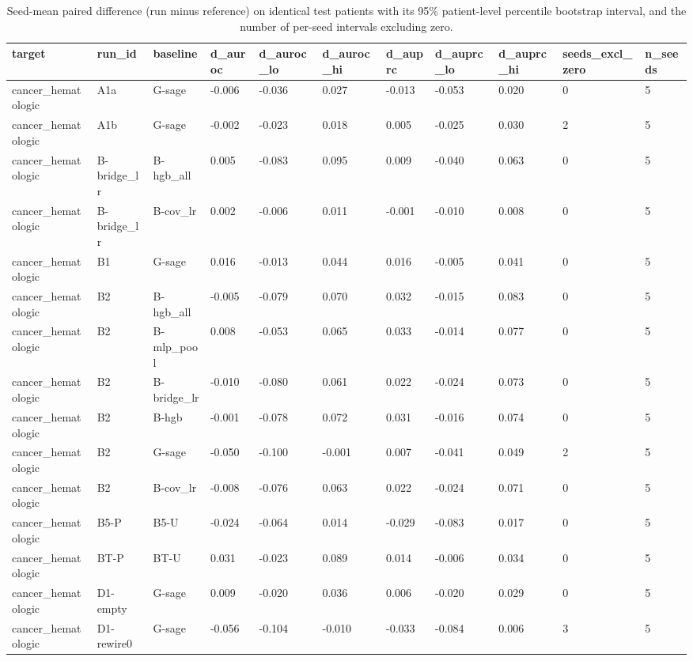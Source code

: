 \begin{table}[t]
\centering\small
\caption{Seed-mean paired difference (run minus reference) on identical test patients with its 95\% patient-level percentile bootstrap interval, and the number of per-seed intervals excluding zero.}\label{tab:paired}
\begin{tabular}{lllllllllll}
\toprule
target & run\_id & baseline & d\_auroc & d\_auroc\_lo & d\_auroc\_hi & d\_auprc & d\_auprc\_lo & d\_auprc\_hi & seeds\_excl\_zero & n\_seeds \\
\midrule
cancer\_hematologic & A1a & G-sage & -0.006 & -0.036 & 0.027 & -0.013 & -0.053 & 0.020 & 0 & 5 \\
cancer\_hematologic & A1b & G-sage & -0.002 & -0.023 & 0.018 & 0.005 & -0.025 & 0.030 & 2 & 5 \\
cancer\_hematologic & B-bridge\_lr & B-hgb\_all & 0.005 & -0.083 & 0.095 & 0.009 & -0.040 & 0.063 & 0 & 5 \\
cancer\_hematologic & B-bridge\_lr & B-cov\_lr & 0.002 & -0.006 & 0.011 & -0.001 & -0.010 & 0.008 & 0 & 5 \\
cancer\_hematologic & B1 & G-sage & 0.016 & -0.013 & 0.044 & 0.016 & -0.005 & 0.041 & 0 & 5 \\
cancer\_hematologic & B2 & B-hgb\_all & -0.005 & -0.079 & 0.070 & 0.032 & -0.015 & 0.083 & 0 & 5 \\
cancer\_hematologic & B2 & B-mlp\_pool & 0.008 & -0.053 & 0.065 & 0.033 & -0.014 & 0.077 & 0 & 5 \\
cancer\_hematologic & B2 & B-bridge\_lr & -0.010 & -0.080 & 0.061 & 0.022 & -0.024 & 0.073 & 0 & 5 \\
cancer\_hematologic & B2 & B-hgb & -0.001 & -0.078 & 0.072 & 0.031 & -0.016 & 0.074 & 0 & 5 \\
cancer\_hematologic & B2 & G-sage & -0.050 & -0.100 & -0.001 & 0.007 & -0.041 & 0.049 & 2 & 5 \\
cancer\_hematologic & B2 & B-cov\_lr & -0.008 & -0.076 & 0.063 & 0.022 & -0.024 & 0.071 & 0 & 5 \\
cancer\_hematologic & B5-P & B5-U & -0.024 & -0.064 & 0.014 & -0.029 & -0.083 & 0.017 & 0 & 5 \\
cancer\_hematologic & BT-P & BT-U & 0.031 & -0.023 & 0.089 & 0.014 & -0.006 & 0.034 & 0 & 5 \\
cancer\_hematologic & D1-empty & G-sage & 0.009 & -0.020 & 0.036 & 0.006 & -0.020 & 0.029 & 0 & 5 \\
cancer\_hematologic & D1-rewire0 & G-sage & -0.056 & -0.104 & -0.010 & -0.033 & -0.084 & 0.006 & 3 & 5 \\

\end{tabular}
\end{table}
